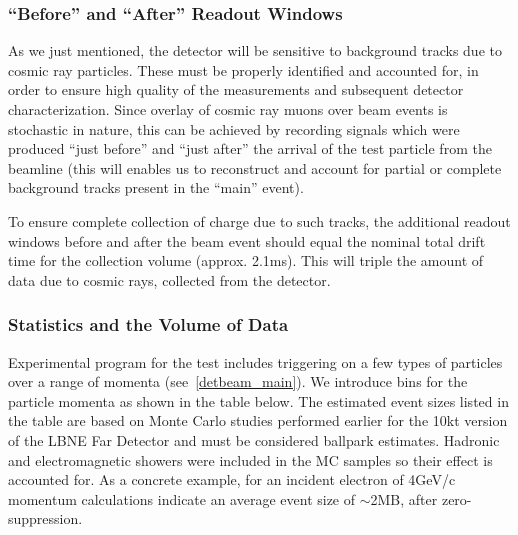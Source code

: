 


\subsubsection{``Before'' and ``After'' Readout Windows}
\label{readout_windows}


As we just mentioned, the detector will be sensitive to background tracks due to cosmic ray particles.  These must be properly identified
and accounted for, in order to ensure high quality of the measurements and subsequent detector characterization. Since overlay of cosmic
ray muons over beam events is stochastic in nature, this can be achieved by recording signals which were produced ``just before'' and ``just after''
the arrival of the test particle from the beamline (this will enables us to reconstruct and account for partial or complete background
tracks present in the ``main'' event).

To ensure complete collection of charge due to such tracks, the additional readout windows before and after 
the beam event should equal the nominal total drift time for the collection volume (approx. 2.1ms). This will triple the amount of
data due to cosmic rays, collected from the detector.


\subsubsection{Statistics and the Volume of Data}
\label{bin_table}
Experimental program for the test includes triggering on a few types of particles over a range of momenta (see~\ref{detbeam_main}). We introduce
bins for the particle momenta as shown in the table below. The estimated event sizes listed in the table are based on
Monte Carlo studies performed earlier for the 10kt version of the LBNE Far Detector and must be considered ballpark estimates. Hadronic and electromagnetic
showers were included in the MC samples so their effect is accounted for. As a concrete example, for an incident electron of 4GeV/c momentum
calculations indicate an average event size of $\sim$2MB, after zero-suppression.


